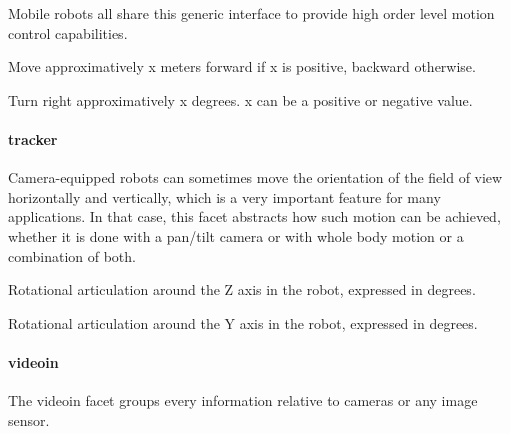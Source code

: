 Mobile robots all share this generic interface to provide high order
level motion control capabilities.

\begin{slots}
  {%
    Move approximatively x meters forward if x is positive, backward
    otherwise.%
  }

  {%
    Turn right approximatively x degrees.  x can be a positive or
    negative value.%
  }

\end{slots}

\paragraph{tracker}

Camera-equipped robots can sometimes move the orientation of the field
of view horizontally and vertically, which is a very important feature
for many applications. In that case, this facet abstracts how such
motion can be achieved, whether it is done with a pan/tilt camera or
with whole body motion or a combination of both.

\begin{slots}
  {%
    Rotational articulation around the Z axis in the robot, expressed
    in degrees.%
  }

  {%
    Rotational articulation around the Y axis in the robot, expressed
    in degrees.%
  }

\end{slots}

\paragraph{videoin}

The videoin facet groups every information relative to cameras or any
image sensor.

